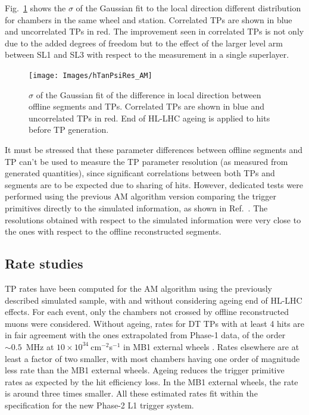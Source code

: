 \documentclass[../main.tex]{subfiles}
\begin{document}
Fig.~\ref{dts:fig:tanpsi_summary} shows the $\sigma$ of the Gaussian fit to the local direction different distribution for chambers in the same wheel and station. Correlated TPs are shown in blue and uncorrelated TPs in red. The improvement seen in correlated TPs is not only due to the added degrees of freedom but to the effect of the larger level arm between SL1 and SL3 with respect to the measurement in a single superlayer.


\begin{figure}[h!]
\begin{center}
\texttt{[image: Images/hTanPsiRes\_AM]}
\end{center}
\caption[$\sigma$ of the difference in direction]{$\sigma$ of the Gaussian fit of the difference in local direction between offline segments and TPs. Correlated TPs are shown in blue and uncorrelated TPs in red. End of HL-LHC ageing is applied to hits before TP generation.}
\label{dts:fig:tanpsi_summary}
\end{figure}

It must be stressed that these parameter differences between offline segments and TP can't be used to measure the TP parameter resolution (as measured from generated quantities), since significant correlations between both TPs and segments are to be expected due to sharing of hits. However, dedicated tests were performed using the previous AM algorithm version comparing the trigger primitives directly to the simulated information, as shown in Ref.~\cite{dts:intro:am}. The resolutions obtained with respect to the simulated information were very close to the ones with respect to the offline reconstructed segments.


\subsection{Rate studies}

TP rates have been computed for the AM algorithm using the previously described simulated sample, with and without considering ageing end of HL-LHC effects. For each event, only the chambers not crossed by offline reconstructed muons were considered. Without ageing, rates for DT TPs with at least 4 hits are in fair agreement with the ones extrapolated from Phase-1 data, of the order $\sim0.5$~MHz at $10\times10^{34}~$cm${}^{-2}$s${}^{-1}$ in MB1 external wheels \cite{muontdr}. Rates elsewhere are at least a factor of two smaller, with most chambers having one order of magnitude less rate than the MB1 external wheels. Ageing reduces the trigger primitive rates as expected by the hit efficiency loss. In the MB1 external wheels, the rate is around three times smaller. All these estimated rates fit within the specification for the new Phase-2 L1 trigger system.
\end{document}
